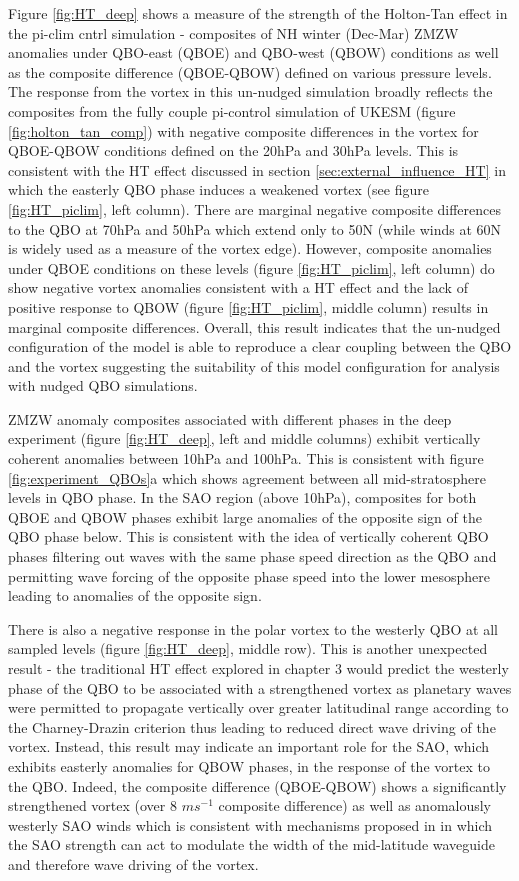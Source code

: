 Figure \ref{fig:HT_deep} shows a measure of the strength of the Holton-Tan effect in the pi-clim cntrl simulation -  composites of NH winter (Dec-Mar) ZMZW anomalies under QBO-east (QBOE) and QBO-west (QBOW) conditions as well as the composite difference (QBOE-QBOW) defined on various pressure levels. The response from the vortex in this un-nudged simulation broadly reflects the composites from the fully couple pi-control simulation of UKESM (figure \ref{fig:holton_tan_comp}) with negative composite differences in the vortex for QBOE-QBOW conditions defined on the 20hPa and 30hPa levels. This is consistent with the HT effect discussed in section \ref{sec:external_influence_HT} in which the easterly QBO phase induces a weakened vortex (see figure \ref{fig:HT_piclim}, left column). There are marginal negative composite differences to the QBO at 70hPa and 50hPa which extend only to 50N (while winds at 60N is widely used as a measure of the vortex edge). However, composite anomalies under QBOE conditions on these levels (figure \ref{fig:HT_piclim}, left column) do show negative vortex anomalies consistent with a HT effect and the lack of positive response to QBOW (figure \ref{fig:HT_piclim}, middle column) results in marginal composite differences. Overall, this result indicates that the un-nudged configuration of the model is able to reproduce a clear coupling between the QBO and the vortex suggesting the suitability of this model configuration for analysis with nudged QBO simulations.


ZMZW anomaly composites associated with different phases in the deep experiment (figure \ref{fig:HT_deep}, left and middle columns) exhibit vertically coherent anomalies between 10hPa and 100hPa. This is consistent with figure \ref{fig:experiment_QBOs}a which shows agreement between all mid-stratosphere levels in QBO phase. In the SAO region (above 10hPa), composites for both QBOE and QBOW phases exhibit large anomalies of the opposite sign of the QBO phase below. This is consistent with the idea of vertically coherent QBO phases filtering out waves with the same phase speed direction as the QBO and permitting wave forcing of the opposite phase speed into the lower mesosphere leading to anomalies of the opposite sign. 

There is also a negative response in the polar vortex to the westerly QBO at all sampled levels (figure \ref{fig:HT_deep}, middle row). This is another unexpected result - the traditional HT effect explored in chapter 3 would predict the westerly phase of the QBO to be associated with a strengthened vortex as planetary waves were permitted to propagate vertically over greater latitudinal range according to the Charney-Drazin criterion thus leading to reduced direct wave driving of the vortex. Instead, this result may indicate an important role for the SAO, which exhibits easterly anomalies for QBOW phases, in the response of the vortex to the QBO. Indeed, the composite difference (QBOE-QBOW) shows a significantly strengthened vortex (over 8 $ms^{-1}$ composite difference) as well as anomalously westerly SAO winds which is consistent with mechanisms proposed in \cite{grayForecasting2020} in which the SAO strength can act to modulate the width of the mid-latitude waveguide and therefore wave driving of the vortex.


